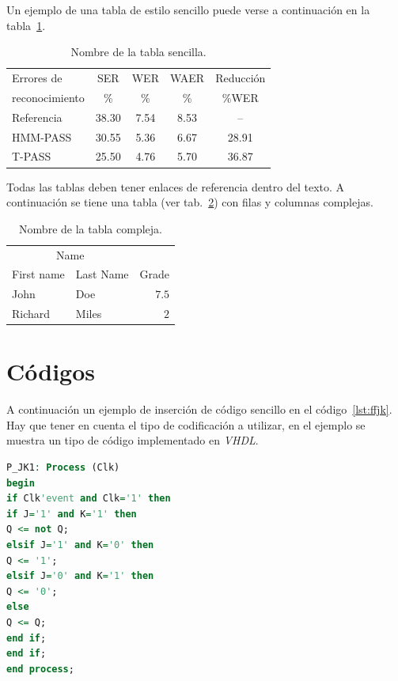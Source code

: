 \documentclass[
10pt,			%
letterpaper,	%
oneside,		%
headinclude, footinclude, %
BCOR5mm, 		%
]{scrartcl}
\begin{document}
Un ejemplo de una tabla de estilo sencillo puede verse a continuación en la tabla~\ref{tab:tab1}.

\begin{table}[htbp]
	\caption{Nombre de la tabla sencilla.}
	\begin{center}
		\begin{tabular}{l|c|c|c|c}
			\toprule
			Errores de     & SER    & WER  & WAER & Reducción \\
			reconocimiento & {\%}   & {\%} & {\%} & {\%}WER   \\
			\hline
			Referencia& 38.30& 7.54& 8.53&    -- \\
			HMM-PASS  & 30.55& 5.36& 6.67& 28.91 \\
			T-PASS    & 25.50& 4.76& 5.70& 36.87 \\
			\bottomrule
		\end{tabular}
	\end{center}
	\label{tab:tab1}
\end{table}
Todas las tablas deben tener enlaces de referencia dentro del texto. A continuación se tiene una tabla (ver tab.~\ref{tab:tab2}) con filas y columnas complejas.

\begin{table}[hbt]
	\caption{Nombre de la tabla compleja.}
	\begin{center}
		\begin{tabular}{llr}
			\toprule
			\multicolumn{2}{c}{Name} \\
			\cmidrule(r){1-2}
			First name & Last Name & Grade \\
			\midrule
			John & Doe & $7.5$ \\
			Richard & Miles & $2$ \\
			\bottomrule
		\end{tabular}
	\end{center}
	\label{tab:tab2}
\end{table}

\section{Códigos}

A continuación un ejemplo de inserción de código sencillo en el código~\ref{lst:ffjk}. Hay que tener en cuenta el tipo de codificación a utilizar, en el ejemplo se muestra un tipo de código implementado en \textit{VHDL}.
\begin{lstlisting}[language=VHDL, caption={Proceso que implementa un biestable J-K},label={lst:ffjk}]
P_JK1: Process (Clk)
begin
if Clk'event and Clk='1' then
if J='1' and K='1' then
Q <= not Q;
elsif J='1' and K='0' then
Q <= '1';
elsif J='0' and K='1' then
Q <= '0';
else
Q <= Q;
end if;
end if;
end process;
\end{lstlisting}
\end{document}
